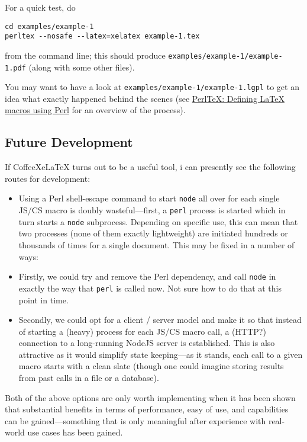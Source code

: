 For a quick test, do

\begin{verbatim}
cd examples/example-1
perltex --nosafe --latex=xelatex example-1.tex
\end{verbatim}

from the command line; this should produce
\texttt{examples/example-1/example-1.pdf} (along with some other files).

You may want to have a look at
\texttt{examples/example-1/example-1.lgpl} to get an idea what exactly
happened behind the scenes (see
\href{https://www.tug.org/TUGboat/tb25-2/tb81pakin.pdf}{PerlTeX:
Defining LaTeX macros using Perl} for an overview of the process).

\subsection{Future Development}\label{future-development}

If CoffeeXeLaTeX turns out to be a useful tool, i can presently see the
following routes for development:

\begin{itemize}
\item
  Using a Perl shell-escape command to start \texttt{node} all over for
  each single JS/CS macro is doubly wasteful---first, a \texttt{perl}
  process is started which in turn starts a \texttt{node} subprocess.
  Depending on specific use, this can mean that two processes (none of
  them exactly lightweight) are initiated hundreds or thousands of times
  for a single document. This may be fixed in a number of ways:
\item
  Firstly, we could try and remove the Perl dependency, and call
  \texttt{node} in exactly the way that \texttt{perl} is called now. Not
  sure how to do that at this point in time.
\item
  Secondly, we could opt for a client / server model and make it so that
  instead of starting a (heavy) process for each JS/CS macro call, a
  (HTTP?) connection to a long-running NodeJS server is established.
  This is also attractive as it would simplify state keeping---as it
  stands, each call to a given macro starts with a clean slate (though
  one could imagine storing results from past calls in a file or a
  database).
\end{itemize}

Both of the above options are only worth implementing when it has been
shown that substantial benefits in terms of performance, easy of use,
and capabilities can be gained---something that is only meaningful after
experience with real-world use cases has been gained.

